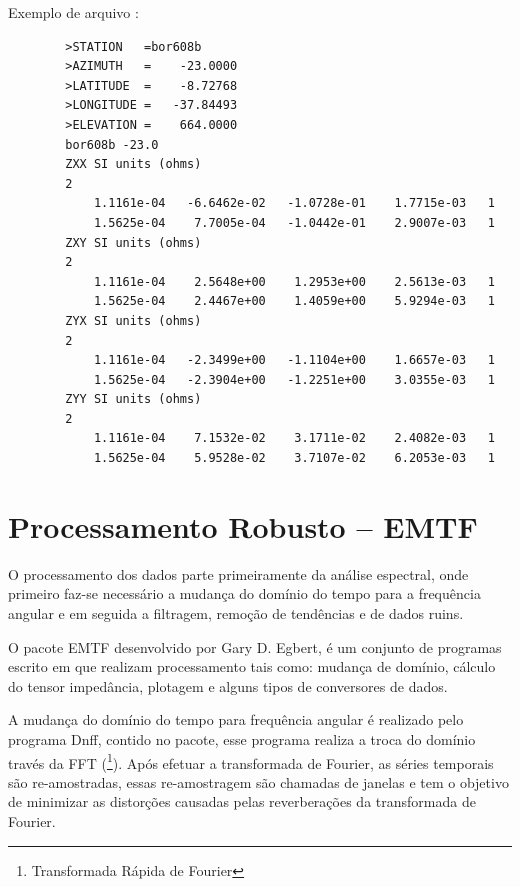         Exemplo de arquivo :
        
\begin{footnotesize}        
\begin{verbatim}
        >STATION   =bor608b
        >AZIMUTH   =    -23.0000
        >LATITUDE  =    -8.72768
        >LONGITUDE =   -37.84493
        >ELEVATION =    664.0000
        bor608b -23.0
        ZXX SI units (ohms)
        2
            1.1161e-04   -6.6462e-02   -1.0728e-01    1.7715e-03   1
            1.5625e-04    7.7005e-04   -1.0442e-01    2.9007e-03   1
        ZXY SI units (ohms)
        2
            1.1161e-04    2.5648e+00    1.2953e+00    2.5613e-03   1
            1.5625e-04    2.4467e+00    1.4059e+00    5.9294e-03   1
        ZYX SI units (ohms)
        2
            1.1161e-04   -2.3499e+00   -1.1104e+00    1.6657e-03   1
            1.5625e-04   -2.3904e+00   -1.2251e+00    3.0355e-03   1
        ZYY SI units (ohms)
        2
            1.1161e-04    7.1532e-02    3.1711e-02    2.4082e-03   1
            1.5625e-04    5.9528e-02    3.7107e-02    6.2053e-03   1
\end{verbatim}
\end{footnotesize}
    
    \section{Processamento Robusto -- EMTF}
        \label{sec-robusto}
        
        
            O processamento dos dados parte primeiramente da análise espectral, onde primeiro faz-se necessário a mudança do domínio do tempo para a frequência angular e em seguida a filtragem, remoção de tendências e de dados ruins.
            
            O pacote EMTF \cite{egbert-emtf} desenvolvido por Gary D. Egbert, é um conjunto de programas escrito em  que realizam processamento tais como: mudança de domínio, cálculo do tensor impedância, plotagem e alguns tipos de conversores de dados. 
            
            A mudança do domínio do tempo para frequência angular é realizado pelo programa Dnff, contido no pacote, esse programa realiza a troca do domínio través da FFT (\footnote{Transformada Rápida de Fourier}). Após efetuar a transformada de Fourier, as séries temporais são re-amostradas, essas re-amostragem são chamadas de janelas e tem o objetivo de minimizar as distorções causadas pelas reverberações da transformada de Fourier.
            
